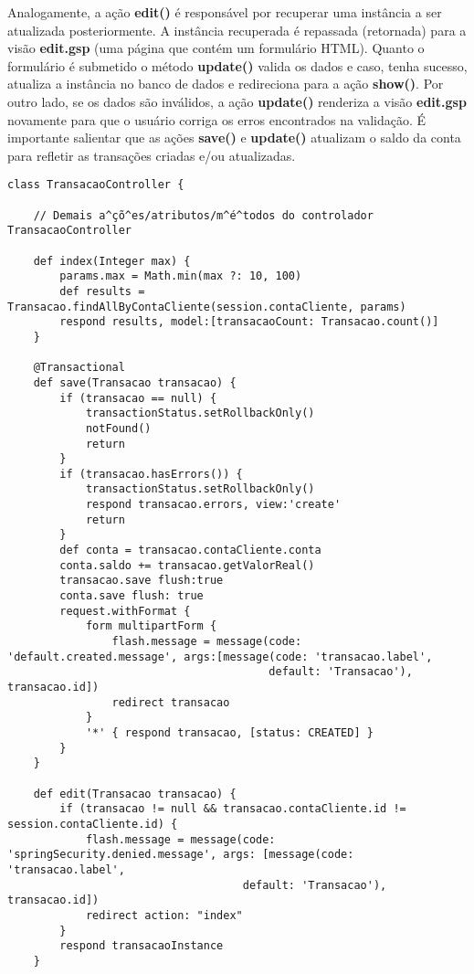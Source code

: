 Analogamente, a  ação {\bf edit()} é  responsável por recuperar  uma instância a
ser atualizada  posteriormente.  A instância recuperada  é repassada (retornada)
para a visão {\bf edit.gsp} (uma página que contém um formulário HTML). Quanto o
formulário é  submetido o método  {\bf update()} valida  os dados e  caso, tenha
sucesso, atualiza a  instância no banco de dados e redireciona  para a ação {\bf
  show()}.  Por  outro lado, se  os dados são  inválidos, a ação  {\bf update()}
renderiza a visão  {\bf edit.gsp} novamente para que o  usuário corriga os erros
encontrados na  validação.  É importante salientar  que as ações  {\bf save()} e
{\bf  update()}  atualizam  o  saldo   da  conta  para  refletir  as  transações
criadas e/ou atualizadas. 

\begin{lstlisting}[caption=Controlador  {\bf  TransacaoController},  frame=trBL,
    float=htbp, label=codTransacaoController3] 
class TransacaoController {

    // Demais a^çõ^es/atributos/m^é^todos do controlador TransacaoController

    def index(Integer max) {
        params.max = Math.min(max ?: 10, 100)
        def results = Transacao.findAllByContaCliente(session.contaCliente, params)
        respond results, model:[transacaoCount: Transacao.count()]
    }

    @Transactional
    def save(Transacao transacao) {
        if (transacao == null) {
            transactionStatus.setRollbackOnly()
            notFound()
            return
        }
        if (transacao.hasErrors()) {
            transactionStatus.setRollbackOnly()
            respond transacao.errors, view:'create'
            return
        }
        def conta = transacao.contaCliente.conta
        conta.saldo += transacao.getValorReal()
        transacao.save flush:true
        conta.save flush: true
        request.withFormat {
            form multipartForm {
                flash.message = message(code: 'default.created.message', args:[message(code: 'transacao.label', 
                                        default: 'Transacao'), transacao.id])
                redirect transacao
            }
            '*' { respond transacao, [status: CREATED] }
        }
    }

    def edit(Transacao transacao) {
        if (transacao != null && transacao.contaCliente.id != session.contaCliente.id) {
            flash.message = message(code: 'springSecurity.denied.message', args: [message(code: 'transacao.label', 
                                    default: 'Transacao'), transacao.id])
            redirect action: "index"
        }
        respond transacaoInstance
    }


\end{lstlisting}
